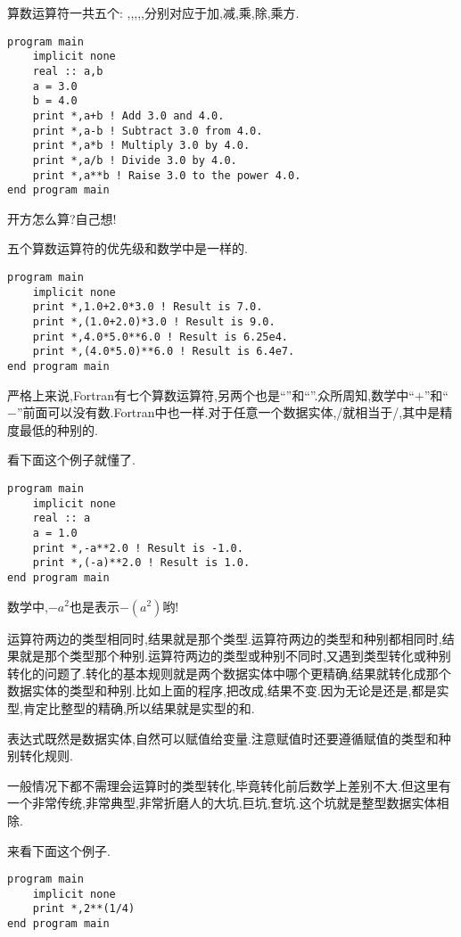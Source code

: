 算数运算符一共五个: \ttt{+},\ttt{-},\ttt{*},\ttt{/},\ttt{**},分别对应于加,减,乘,除,乘方.
\begin{lstlisting}
program main
    implicit none
    real :: a,b
    a = 3.0
    b = 4.0
    print *,a+b ! Add 3.0 and 4.0.
    print *,a-b ! Subtract 3.0 from 4.0.
    print *,a*b ! Multiply 3.0 by 4.0.
    print *,a/b ! Divide 3.0 by 4.0.
    print *,a**b ! Raise 3.0 to the power 4.0.
end program main
\end{lstlisting}

开方怎么算?自己想!

五个算数运算符的优先级和数学中是一样的.
\begin{lstlisting}
program main
    implicit none
    print *,1.0+2.0*3.0 ! Result is 7.0.
    print *,(1.0+2.0)*3.0 ! Result is 9.0.
    print *,4.0*5.0**6.0 ! Result is 6.25e4.
    print *,(4.0*5.0)**6.0 ! Result is 6.4e7.
end program main
\end{lstlisting}

严格上来说,Fortran有七个算数运算符,另两个也是``\ttt{+}''和``\ttt{-}''.众所周知,数学中``$+$''和``$-$''前面可以没有数.Fortran中也一样.对于任意一个数据实体\ttt{[q]},\ttt{+[q1]}/\ttt{-[q1]}就相当于\ttt{[zero]+[q1]}/\ttt{[zero]-[q1]},其中\ttt{[zero]}是精度最低的种别的.

看下面这个例子就懂了.
\begin{lstlisting}
program main
    implicit none
    real :: a
    a = 1.0
    print *,-a**2.0 ! Result is -1.0.
    print *,(-a)**2.0 ! Result is 1.0.
end program main
\end{lstlisting}

数学中,$-a^2$也是表示$-(a^2)$哟!

运算符两边的类型相同时,结果就是那个类型.运算符两边的类型和种别都相同时,结果就是那个类型那个种别.运算符两边的类型或种别不同时,又遇到类型转化或种别转化的问题了.转化的基本规则就是两个数据实体中哪个更精确,结果就转化成那个数据实体的类型和种别.比如上面的程序,把改成,结果不变.因为无论是还是,都是实型,肯定比整型的精确,所以结果就是实型的和.

表达式既然是数据实体,自然可以赋值给变量.注意赋值时还要遵循赋值的类型和种别转化规则.

一般情况下都不需理会运算时的类型转化,毕竟转化前后数学上差别不大.但这里有一个非常传统,非常典型,非常折磨人的大坑,巨坑,奆坑.这个坑就是整型数据实体相除.

来看下面这个例子.
\begin{lstlisting}
program main
    implicit none
    print *,2**(1/4)
end program main
\end{lstlisting}

